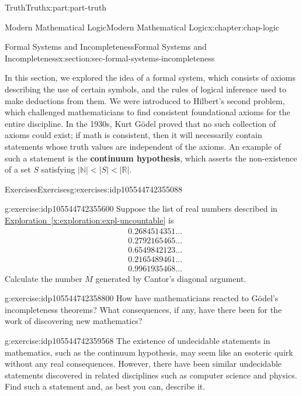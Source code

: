 \documentclass[oneside,10pt,]{book}
\newcommand{\xreffont}{\relax}
\newcommand{\terminology}[1]{\textbf{#1}}
\numberwithin{equation}{section}
\def\N{{\mathbb N}}
\def\R{{\mathbb R}}
\newcommand{\lt}{<}
\newcommand{\amp}{&}
\begin{document}
\begin{partptx}{Truth}{}{Truth}{}{}{x:part:part-truth}
\begin{chapterptx}{Modern Mathematical Logic}{}{Modern Mathematical Logic}{}{}{x:chapter:chap-logic}
\begin{sectionptx}{Formal Systems and Incompleteness}{}{Formal Systems and Incompleteness}{}{}{x:section:sec-formal-systems-incompleteness}
\begin{conclusion}{}
In this section, we explored the idea of a formal system, which consists of axioms describing the use of certain symbols, and the rules of logical inference used to make deductions from them. We were introduced to Hilbert's second problem, which challenged mathematicians to find consistent foundational axioms for the entire discipline. In the 1930s, Kurt Gödel proved that no such collection of axioms could exist; if math is consistent, then it will necessarily contain statements whose truth values are independent of the axioms. An example of such a statement is the \terminology{continuum hypothesis}, which asserts the non-existence of a set \(S\) satisfying \(|\N| \lt |S| \lt |\R|\).%
\end{conclusion}%
%
%
\typeout{************************************************}
\typeout{************************************************}
%
\begin{exercises-subsection}{Exercises}{}{Exercises}{}{}{g:exercises:idp105544742355088}
\begin{divisionexercise}{1}{}{}{g:exercise:idp105544742355600}%
Suppose the list of real numbers described in \hyperref[x:exploration:expl-uncountable]{Exploration~{\xreffont\ref{x:exploration:expl-uncountable}}} is%
%
\begin{align*}
\amp 0.2684514351\ldots\\
\amp 0.2792165465\ldots\\
\amp 0.6549842123\ldots\\
\amp 0.2165489461\ldots\\
\amp 0.9961935468\ldots
\end{align*}
Calculate the number \(M\) generated by Cantor's diagonal argument.%
\end{divisionexercise}%
\begin{divisionexercise}{2}{}{}{g:exercise:idp105544742358800}%
How have mathematicians reacted to Gödel's incompleteness theorems? What consequences, if any, have there been for the work of discovering new mathematics?%
\end{divisionexercise}%
\begin{divisionexercise}{3}{}{}{g:exercise:idp105544742359568}%
The existence of undecidable statements in mathematics, such as the continuum hypothesis, may seem like an esoteric quirk without any real consequences. However, there have been similar undecidable statements discovered in related disciplines such as computer science and physics. Find such a statement and, as best you can, describe it.%
\end{divisionexercise}%
\end{exercises-subsection}
\end{sectionptx}
\end{chapterptx}
\end{partptx}
\end{document}
